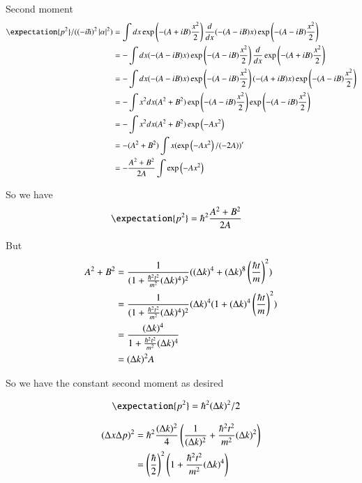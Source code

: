 \documentclass{article}
\begin{document}
Second moment
\begin{align*}
\expectation{p^2}/((-i\hbar)^2\Abs{\alpha}^2) 
&= \int dx
\exp\left( -(A + iB) \frac{x^2}{2} \right) 
\frac{d}{dx}
(-(A -iB)x) \exp\left( -(A - iB) \frac{x^2}{2} \right)  \\
&= -\int dx
(-(A -iB)x) \exp\left( -(A - iB) \frac{x^2}{2} \right)  
\frac{d}{dx}
\exp\left( -(A + iB) \frac{x^2}{2} \right) 
\\
&= -\int dx
(-(A -iB)x) \exp\left( -(A - iB) \frac{x^2}{2} \right) 
(-(A +iB)x) \exp\left( -(A - iB) \frac{x^2}{2} \right)  \\
&= -\int x^2 dx
(A^2 + B^2) \exp\left( -(A - iB) \frac{x^2}{2} \right) 
\exp\left( -(A - iB) \frac{x^2}{2} \right)  \\
&= -\int x^2 dx (A^2 + B^2) \exp\left( -A x^2 \right) \\
&= - (A^2 + B^2) \int x (\exp\left( -A x^2 \right)/(-2A))' \\
&= -\frac{A^2 + B^2}{2A} \int \exp\left( -A x^2 \right) \\
\end{align*}

So we have
\begin{align*}
\expectation{p^2} &= \hbar^2 \frac{A^2 + B^2}{2A} 
\end{align*}

But 
\begin{align*}
A^2 + B^2 
&= 
\frac{1}{(1 + \frac{\hbar^2 t^2}{m^2}(\Delta k)^4)^2} ((\Delta k)^4 + (\Delta k)^8 \left(\frac{\hbar t}{m}\right)^2 ) \\
&= 
\frac{1}{(1 + \frac{\hbar^2 t^2}{m^2}(\Delta k)^4)^2} (\Delta k)^4(1 + (\Delta k)^4 \left(\frac{\hbar t}{m}\right)^2 ) \\
&= 
\frac{(\Delta k)^4}{1 + \frac{\hbar^2 t^2}{m^2}(\Delta k)^4} \\
&= (\Delta k)^2 A
\end{align*}

So we have the constant second moment as desired

\begin{align*}
\expectation{p^2} &= \hbar^2 (\Delta k)^2/2
\end{align*}

\begin{align*}
(\Delta x \Delta p)^2
&= \hbar^2 \frac{(\Delta k)^2}{4} \left( \frac{1}{(\Delta k)^2} + \frac{\hbar^2 t^2}{m^2}(\Delta k)^2 \right) \\
&= \left(\frac{\hbar}{2}\right)^2 \left( 1 + \frac{\hbar^2 t^2}{m^2}(\Delta k)^4 \right) \\
\end{align*}
\end{document}
